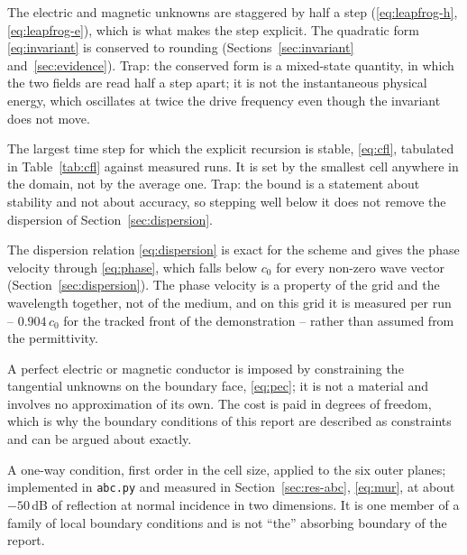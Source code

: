 \begin{description}[leftmargin=1.6em,style=nextline,itemsep=4pt]
  \item[Leapfrog update and the mixed-state invariant.]
        The electric and magnetic unknowns are staggered by half a step (\eqref{eq:leapfrog-h},
        \eqref{eq:leapfrog-e}), which is what makes the step explicit. The quadratic form \eqref{eq:invariant} is
        conserved to rounding (Sections~\ref{sec:invariant} and~\ref{sec:evidence}). Trap: the conserved form is a
        mixed-state quantity, in which the two fields are read half a step apart; it is not the instantaneous
        physical energy, which oscillates at twice the drive frequency even though the invariant does not move.

  \item[CFL bound.]
        The largest time step for which the explicit recursion is stable, \eqref{eq:cfl}, tabulated in
        Table~\ref{tab:cfl} against measured runs. It is set by the smallest cell anywhere in the domain, not by the
        average one. Trap: the bound is a statement about stability and not about accuracy, so stepping well below
        it does not remove the dispersion of Section~\ref{sec:dispersion}.

  \item[Numerical dispersion; grid-dependent phase velocity.]
        The dispersion relation \eqref{eq:dispersion} is exact for the scheme and gives the phase velocity through
        \eqref{eq:phase}, which falls below $c_0$ for every non-zero wave vector (Section~\ref{sec:dispersion}).
        The phase velocity is a property of the grid and the wavelength together, not of the medium, and on this
        grid it is measured per run -- $0.904\,c_0$ for the tracked front of the demonstration -- rather than
        assumed from the permittivity.

  \item[PEC and PMC as constraints on the unknown space.]
        A perfect electric or magnetic conductor is imposed by constraining the tangential unknowns on the
        boundary face, \eqref{eq:pec}; it is not a material and involves no approximation of its own. The cost is
        paid in degrees of freedom, which is why the boundary conditions of this report are described as
        constraints and can be argued about exactly.

  \item[Mur first-order absorbing condition.]
        A one-way condition, first order in the cell size, applied to the six outer planes; implemented in
        \texttt{abc.py} and measured in Section~\ref{sec:res-abc}, \eqref{eq:mur}, at about $-50$\,dB of
        reflection at normal incidence in two dimensions. It is one member of a family of local boundary
        conditions and is not ``the'' absorbing boundary of the report.


\end{description}
